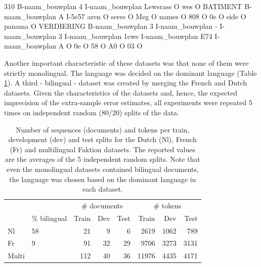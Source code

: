 \documentclass[12pt,a4paper,]{book}
\newenvironment{Shaded}{\begin{snugshade}}{\end{snugshade}}
\newcommand{\ExtensionTok}[1]{#1}
\newcommand{\NormalTok}[1]{#1}
\begin{document}
\begin{Shaded}
\begin{Highlighting}[]
\ExtensionTok{310}\NormalTok{ B-naam_bouwplan}
\ExtensionTok{4}\NormalTok{ I-naam_bouwplan}
\ExtensionTok{Lewsrass}\NormalTok{ O}
\ExtensionTok{wes}\NormalTok{ O}
\ExtensionTok{BATIMENT}\NormalTok{ B-naam_bouwplan}
\ExtensionTok{A}\NormalTok{ I-5e57}
\ExtensionTok{aren}\NormalTok{ O}
\ExtensionTok{seres}\NormalTok{ O}
\ExtensionTok{Meg}\NormalTok{ O}
\ExtensionTok{names}\NormalTok{ O}
\ExtensionTok{808}\NormalTok{ O}
\ExtensionTok{0e}\NormalTok{ O}
\ExtensionTok{side}\NormalTok{ O}
\ExtensionTok{panama}\NormalTok{ O}
\ExtensionTok{VERDIERING}\NormalTok{ B-naam_bouwplan}
\ExtensionTok{3}\NormalTok{ I-naam_bouwplan}
\ExtensionTok{-}\NormalTok{ I-naam_bouwplan}
\ExtensionTok{3}\NormalTok{ I-naam_bouwplan}
\ExtensionTok{1ewe}\NormalTok{ I-naam_bouwplan}
\ExtensionTok{E74}\NormalTok{ I-naam_bouwplan}
\ExtensionTok{A}\NormalTok{ O}
\ExtensionTok{0e}\NormalTok{ O}
\ExtensionTok{58}\NormalTok{ O}
\ExtensionTok{A0}\NormalTok{ O}
\ExtensionTok{03}\NormalTok{ O}
\end{Highlighting}
\end{Shaded}

Another important characteristic of these datasets was that none of them were strictly monolingual. The language was decided on the dominant language (Table \ref{tab:faktion-ds}). A third - bilingual - dataset was created by merging the French and Dutch datasets. Given the characteristics of the datasets and, hence, the expected imprecision of the extra-sample error estimates, all experiments were repeated 5 times on independent random (80/20) splits of the data.

\begin{table}

\caption{\label{tab:faktion-ds}Number of sequences (documents) and tokens per train, development (dev) and test splits for the Dutch (Nl), French (Fr) and multilingual Faktion datasets. The reported values are the averages of the 5 independent random splits. Note that even the monolingual datasets contained bilingual documents, the language was chosen based on the dominant language in each dataset.}
\centering
\begin{tabular}[t]{llrrrrrr}
\toprule
\multicolumn{2}{c}{ } & \multicolumn{3}{c}{\# documents} & \multicolumn{3}{c}{\# tokens} \\
\cmidrule(l{3pt}r{3pt}){3-5} \cmidrule(l{3pt}r{3pt}){6-8}
 & \% bilingual & Train & Dev & Test & Train & Dev & Test\\
\midrule
Nl & 58 & 21 & 9 & 6 & 2619 & 1062 & 789\\
Fr & 9 & 91 & 32 & 29 & 9706 & 3273 & 3131\\
Multi &  & 112 & 40 & 36 & 11976 & 4435 & 4171\\
\bottomrule
\end{tabular}
\end{table}
\end{document}

